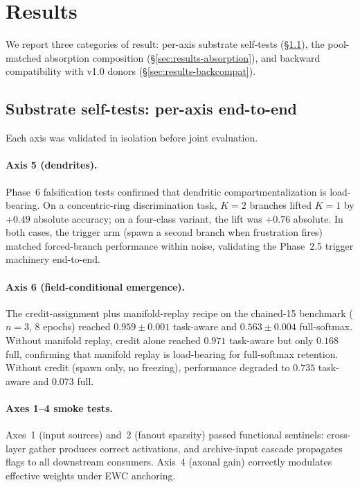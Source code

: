 \documentclass[11pt]{article}
\begin{document}
\section{Results}
\label{sec:results}

We report three categories of result: per-axis substrate self-tests
(\S\ref{sec:results-axes}), the pool-matched absorption composition
(\S\ref{sec:results-absorption}), and backward compatibility with v1.0
donors (\S\ref{sec:results-backcompat}).

\subsection{Substrate self-tests: per-axis end-to-end}
\label{sec:results-axes}

Each axis was validated in isolation before joint evaluation.

\paragraph{Axis 5 (dendrites).}
Phase~6 falsification tests confirmed that dendritic compartmentalization
is load-bearing.
On a concentric-ring discrimination task, $K{=}2$ branches lifted
$K{=}1$ by $+0.49$ absolute accuracy; on a four-class variant, the lift
was $+0.76$ absolute.
In both cases, the trigger arm (spawn a second branch when frustration
fires) matched forced-branch performance within noise, validating the
Phase~2.5 trigger machinery end-to-end.

\paragraph{Axis 6 (field-conditional emergence).}
The credit-assignment plus manifold-replay recipe on the chained-15
benchmark ($n{=}3$, 8 epochs) reached $0.959 \pm 0.001$ task-aware and
$0.563 \pm 0.004$ full-softmax.
Without manifold replay, credit alone reached $0.971$ task-aware but
only $0.168$ full, confirming that manifold replay is load-bearing for
full-softmax retention.
Without credit (spawn only, no freezing), performance degraded to
$0.735$ task-aware and $0.073$ full.

\paragraph{Axes 1--4 smoke tests.}
Axes~1 (input sources) and~2 (fanout sparsity) passed functional
sentinels: cross-layer gather produces correct activations, and
archive-input cascade propagates flags to all downstream consumers.
Axis~4 (axonal gain) correctly modulates effective weights under EWC
anchoring.
\end{document}
